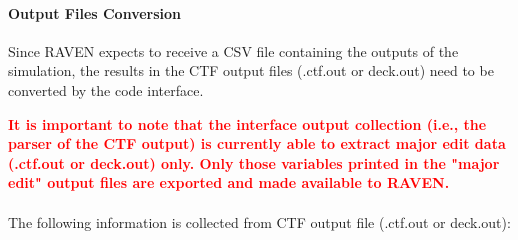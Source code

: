 \paragraph{Output Files Conversion}
Since RAVEN expects to receive a CSV file containing the outputs of the simulation, the results in the CTF output
files (.ctf.out or deck.out) need to be converted by the code interface.

\noindent \textcolor{red}{
\textbf{It is important to note that the interface output collection (i.e., the parser of the CTF output) is currently able to extract
major edit data (.ctf.out or deck.out) only. Only those variables printed in the "major edit" output files are exported and made available to RAVEN.} } \\
\\The following information is collected from CTF output file (.ctf.out or deck.out):
